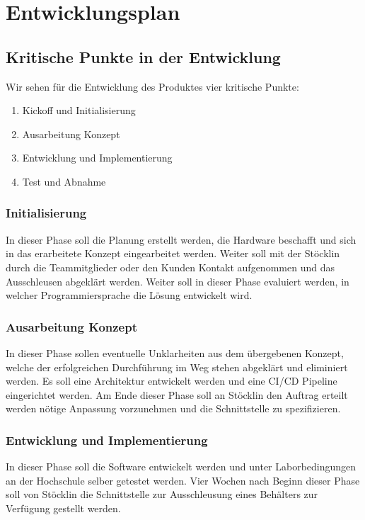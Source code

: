 \chapter{Entwicklungsplan}

\section{Kritische Punkte in der Entwicklung}
Wir sehen für die Entwicklung des Produktes vier kritische Punkte:
\begin{enumerate}
	\item Kickoff und Initialisierung
	\item Ausarbeitung Konzept
	\item Entwicklung und Implementierung
	\item Test und Abnahme
\end{enumerate}

\subsection{Initialisierung}
In dieser Phase soll die Planung erstellt werden, die Hardware beschafft und sich in das erarbeitete Konzept eingearbeitet werden. Weiter soll mit der Stöcklin durch die Teammitglieder oder den Kunden Kontakt aufgenommen und das Ausschleusen abgeklärt werden. Weiter soll in dieser Phase evaluiert werden, in welcher Programmiersprache die Lösung entwickelt wird.

\subsection{Ausarbeitung Konzept}
In dieser Phase sollen eventuelle Unklarheiten aus dem übergebenen Konzept, welche der erfolgreichen Durchführung im Weg stehen abgeklärt und eliminiert werden. Es soll eine Architektur entwickelt werden und eine CI/CD Pipeline eingerichtet werden. Am Ende dieser Phase soll an Stöcklin den Auftrag erteilt werden nötige Anpassung vorzunehmen und die Schnittstelle zu spezifizieren.

\subsection{Entwicklung und Implementierung}
In dieser Phase soll die Software entwickelt werden und unter Laborbedingungen an der Hochschule selber getestet werden. Vier Wochen nach Beginn dieser Phase soll von Stöcklin die Schnittstelle zur Ausschleusung eines Behälters zur Verfügung gestellt werden.

